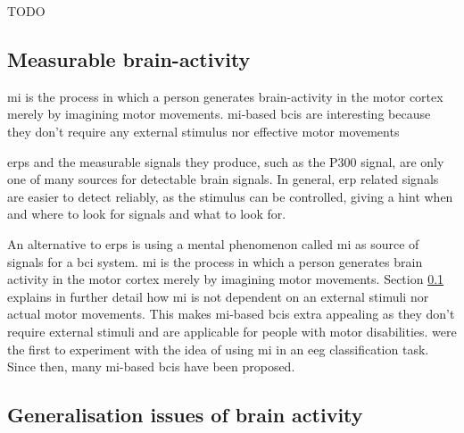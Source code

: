TODO


\subsection{Measurable brain-activity}
\label{subsec:biomedical_signals_brain_signals_measurable_brain_activity}



\Gls{mi} is the process in which a person generates brain-activity in the motor cortex merely by imagining motor movements.
\Gls{mi}-based \glspl{bci} are interesting because they don't require any external stimulus nor effective motor movements

\glspl{erp} and the measurable signals they produce, such as the P300 signal, are only one of many sources for detectable brain signals.
In general, \gls{erp} related signals are easier to detect reliably, as the stimulus can be controlled, giving a hint when and where to look for signals and what to look for.

An alternative to \glspl{erp} is using a mental phenomenon called \gls{mi} as source of signals for a \gls{bci} system.
\Gls{mi} is the process in which a person generates brain activity in the motor cortex merely by imagining motor movements.
Section \ref{subsec:biomedical_signals_brain_signals_measurable_brain_activity} explains in further detail how \gls{mi} is not dependent on an external stimuli nor actual motor movements.
This makes \gls{mi}-based \glspl{bci} extra appealing as they don't require external stimuli and are applicable for people with motor disabilities.
 were the first to experiment with the idea of using \gls{mi} in an \gls{eeg} classification task.
Since then, many \gls{mi}-based \glspl{bci} have been proposed.


\subsection{Generalisation issues of brain activity}
\label{subsec:biomedical_signals_brain_signals_generalisation}

